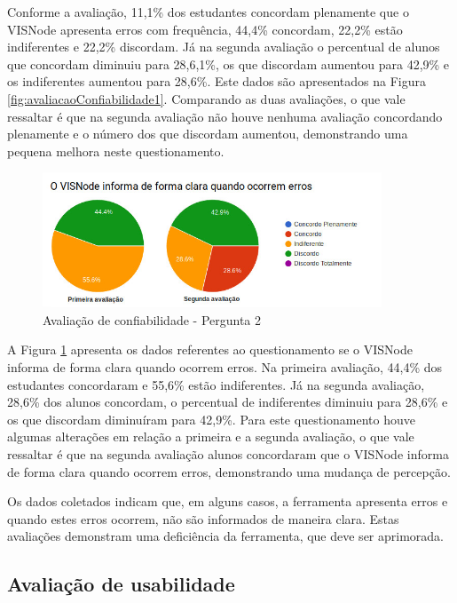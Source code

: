 \documentclass[
	12pt,				%
	oneside,			%
	a4paper,			%
	english,			%
	french,				%
	spanish,			%
	brazil,				%
	]{abntex2}
\begin{document}
Conforme a avaliação, 11,1\% dos estudantes concordam plenamente que o VISNode apresenta erros com frequência, 44,4\% concordam, 22,2\% estão indiferentes e 22,2\% discordam. Já na segunda avaliação o percentual de alunos que concordam diminuiu para 28,6,1\%, os que discordam aumentou para 42,9\% e os indiferentes aumentou para 28,6\%. Este dados são apresentados na Figura  \ref{fig:avaliacaoConfiabilidade1}. Comparando as duas avaliações, o que vale ressaltar é que na segunda avaliação não houve nenhuma avaliação concordando plenamente e o número dos que discordam aumentou, demonstrando uma pequena melhora neste questionamento.

\begin{figure}[H]
\centering
\caption{Avaliação de confiabilidade - Pergunta 2}\label{fig:avaliacaoConfiabilidade2}
\includegraphics[width=0.9\textwidth]{imagens/avaliacoes/avaliacao_confiabilidade_2.jpg}
\sourceAuthor
\end{figure}

A Figura \ref{fig:avaliacaoConfiabilidade2} apresenta os dados referentes ao questionamento se o VISNode informa de forma clara quando ocorrem erros. Na primeira avaliação, 44,4\% dos estudantes concordaram e 55,6\% estão indiferentes. Já na segunda avaliação, 28,6\% dos alunos concordam, o percentual de indiferentes diminuiu para 28,6\% e os que discordam diminuíram para 42,9\%. Para este questionamento houve algumas alterações em relação a primeira e a segunda avaliação, o que vale ressaltar é que na segunda avaliação alunos concordaram que o VISNode informa de forma clara quando ocorrem erros, demonstrando uma mudança de percepção.

Os dados coletados indicam que, em alguns casos, a ferramenta apresenta erros e quando estes erros ocorrem, não são informados de maneira clara. Estas avaliações demonstram uma deficiência da ferramenta, que deve ser aprimorada.

\subsection{Avaliação de usabilidade}
\end{document}
